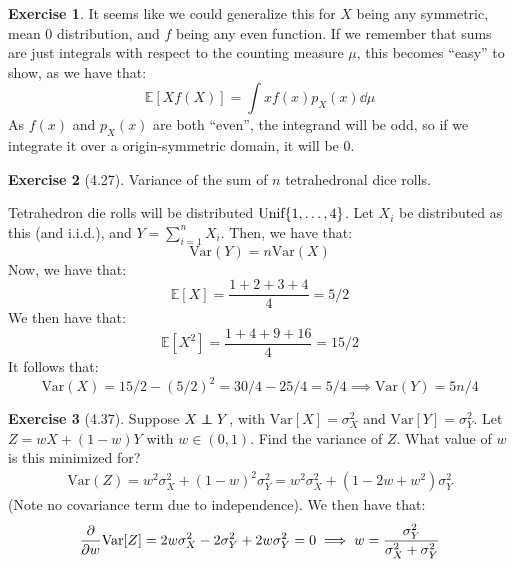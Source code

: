 \documentclass{article}
\theoremstyle{definition}
\newtheorem{exercise}{Exercise}[section]
\newcommand\independent{\protect\mathpalette{\protect\independenT}{\perp}}
\def\independenT#1#2{\mathrel{\rlap{$#1#2$}\mkern2mu{#1#2}}}
\newcommand{\E}{\mathbb{E}}
\newcommand{\Var}{\text{Var}}
\begin{document}
\begin{exercise}
It seems like we could generalize this for $X$ being any symmetric, mean 0 distribution, and $f$ being any even function.
If we remember that sums are just integrals with respect to the counting measure $\mu$, this becomes ``easy'' to show, as we have that:
\begin{equation}
\E[Xf(X)] = \int xf(x)p_{X}(x)\dd \mu
\end{equation}
As $f(x)$ and $p_X(x)$ are both ``even'', the integrand will be odd, so if we integrate it over a origin-symmetric domain, it will be $0$.
\end{exercise}
\begin{exercise}[4.27]
Variance of the sum of $n$ tetrahedronal dice rolls.

Tetrahedron die rolls will be distributed $\text{Unif}\Bqty{1,\dots,4}$.
Let $X_i$ be distributed as this (and i.i.d.), and $Y = \sum_{i = 1}^n X_i$.
Then, we have that:
\begin{equation}
\Var(Y) = n\Var(X)
\end{equation}
Now, we have that:
\begin{equation}
\E[X] = \frac{1+2+3+4}{4} = 5/2
\end{equation}
We then have that:
\begin{equation}
\E[X^2] = \frac{1+4+9+16}{4} = 15/2
\end{equation}
It follows that:
\begin{equation}
\Var(X) = 15/2 -(5/2)^2 = 30/4 - 25/4 = 5/4\implies \Var(Y) = 5n/4
\end{equation}
\end{exercise}
\begin{exercise}[4.37]
Suppose $X\independent Y$, with $\Var[X] = \sigma_X^2$ and $\Var[Y] = \sigma_Y^2$.
Let $Z = wX+(1-w)Y$ with $w\in (0,1)$.
Find the variance of $Z$.
What value of $w$ is this minimized for?
\begin{align*}
\Var(Z) = w^2\sigma_X^2 + (1-w)^2\sigma_Y^2 = w^2\sigma_X^2 + (1-2w+w^2)\sigma_Y^2
\end{align*}
(Note no covariance term due to independence).
We then have that:
\begin{align*}
\pdv{}{w}\Var[Z] = 2w\sigma_X^2 -2\sigma_Y^2 + 2w\sigma_Y^2 = 0\implies w = \frac{\sigma_Y^2}{\sigma_X^2+\sigma_Y^2}
\end{align*}
\end{exercise}
\end{document}
